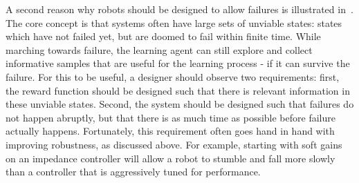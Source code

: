 A second reason why robots should be designed to allow failures is illustrated in~\cite{heim2018unviable}. The core concept is that systems often have large sets of unviable states: states which have not failed yet, but are doomed to fail within finite time. While marching towards failure, the learning agent can still explore and collect informative samples that are useful for the learning process - if it can survive the failure. For this to be useful, a designer should observe two requirements: first, the reward function should be designed such that there is relevant information in these unviable states. Second, the system should be designed such that failures do not happen abruptly, but that there is as much time as possible before failure actually happens. Fortunately, this requirement often goes hand in hand with improving robustness, as discussed above. For example, starting with soft gains on an impedance controller will allow a robot to stumble and fall more slowly than a controller that is aggressively tuned for performance.



